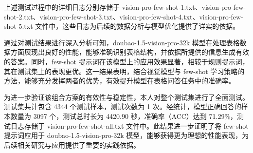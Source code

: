 




上述测试过程中的详细日志分别存储于 vision-pro-few-shot-1.txt、vision-pro-few-shot-2.txt、vision-pro-few-shot-3.txt、vision-pro-few-shot-4.txt、vision-pro-few-shot-5.txt 文件中，这些日志为后续的数据分析与模型优化提供了详实的依据。

通过对测试结果进行深入分析可知，doubao-1.5-vision-pro-32k 模型在处理表格数据方面展现出良好的性能，能够准确识别表格结构，并依据所提供的信息生成有效的答案。同时，few-shot 提示词在该模型上的应用效果显著，相较于规则提示词，其在测试集上的表现更优。这一结果表明，结合视觉模型与 few-shot 学习策略的方法，能够充分发挥两者的优势，有效提升模型在表格问答任务中的准确率。

为进一步验证该组合方案的有效性与稳定性，本人对整个测试集进行了全面测试。测试集共计包含 4344 个测试样本，测试次数为 1 次。经统计，模型正确回答的样本数量为 3097 个，测试总时长为 4420.90 秒，准确率（ACC）达到 71.29\%，测试日志存储于 vision-pro-few-shot-all.txt 文件中。此结果进一步证明了将 few-shot 提示词应用于 doubao-1.5-vision-pro-32k 模型，能够获得更为理想的性能表现，为后续相关研究与应用提供了重要的实践依据。

